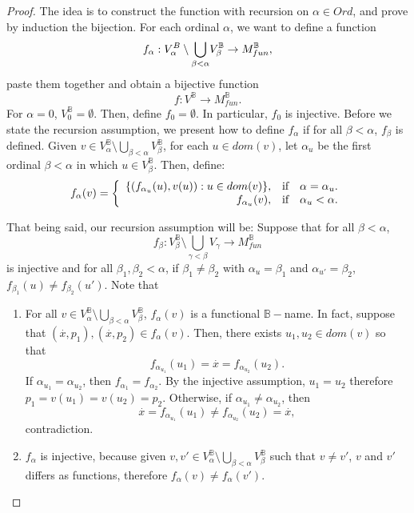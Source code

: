 \documentclass[10pt,longbibliography]{article}
\newcommand{\B}{\mathbb{B}}
\newcommand{\xdot}{\overset{.}{x}}
\begin{document}
\begin{proof}
	The idea is to construct the function with recursion on $\alpha \in Ord$, and prove by induction the bijection. For each ordinal $\alpha$, we want to define a function $$f_{\alpha}: V_{\alpha}^{\\B}\setminus \underset{\beta < \alpha}{\bigcup} V^{\B}_{\beta} \to M^{\B}_{fun},$$ paste them together and obtain a bijective function $$f : V^{\B} \to M^{\B}_{fun}.$$
	For $\alpha = 0$, $V_{0}^{\B} = \emptyset$. Then, define $f_{0} = \emptyset.$ In particular, $f_{0}$ is injective. Before we state the recursion assumption, we present how to define $f_{\alpha}$ if for all $\beta < \alpha$, $f_{\beta}$ is defined. Given $v \in V_{\alpha}^{\B} \setminus \underset{\beta < \alpha }{\bigcup}V^{\B}_{\beta}$, for each $u \in dom(v) $, let $\alpha_{u}$ be the first ordinal $\beta <\alpha$ in which $u \in V_{\beta}^{\B}$. Then, define: 
	$$ f_{\alpha}(v)  = \left\{\begin{array}{rll} \{(f_{\alpha_{u}}(u),v(u)): u \in dom(v)\},   & \hbox{if} & \alpha = \alpha_{u}. \\ f_{\alpha_{u}}(v),  & \hbox{if} & \alpha_{u} < \alpha .\end{array}\right. $$
	
	That being said, our recursion assumption will be: Suppose that for all $\beta < \alpha$, $$f_{\beta}: V_{\beta}^{\B} \setminus \underset{\gamma < \beta}{\bigcup} V_{\gamma} \to M^{\B}_{fun}$$ is injective  and for all $\beta_{1},\beta_{2} < \alpha$, if $\beta_{1} \neq \beta_{2}$ with $\alpha_{u} = \beta_{1}$ and $\alpha_{u'} = \beta_{2}$, $f_{\beta_{1}}(u) \neq f_{\beta_{2}}(u')$. Note that 
	
	\begin{enumerate}
		\item For all $v \in V^{\B}_{\alpha} \setminus \underset{\beta < \alpha}{\bigcup} V^{\B}_{\beta}$, $f_{\alpha}(v)$ is a functional $\B-$name. In fact, suppose that $(\xdot, p_{1}),(\xdot,p_{2}) \in f_{\alpha}(v)$. Then, there exists $u_{1},u_{2} \in dom(v)$ so that $$f_{\alpha_{u_{1}}}(u_{1}) = \xdot = f_{\alpha_{u_{2}}}(u_{2}).$$
		If $\alpha_{u_{1}} = \alpha_{u_{2}}$, then $f_{\alpha_{1}} = f_{\alpha_{2}}$. By the injective assumption, $u_{1} = u_{2}$ therefore $p_{1} = v(u_{1}) = v(u_{2}) = p_{2}.$ Otherwise, if $\alpha_{u_{1}} \neq \alpha_{u_{2}}$, then $$\xdot = f_{\alpha_{u_{1}}}(u_{1}) \neq f_{\alpha_{u_{2}}}(u_{2}) = \xdot,$$
		contradiction.
		\item $f_{\alpha}$ is injective, because given $v,v' \in V^{\B}_{\alpha} \setminus \underset{\beta < \alpha}{\bigcup} V^{\B}_{\beta}$ such that $v \neq v'$, $v$ and $v'$ differs as functions, therefore $f_{\alpha}(v) \neq f_{\alpha}(v')$.
	\end{enumerate}
	

\end{proof}
\end{document}
